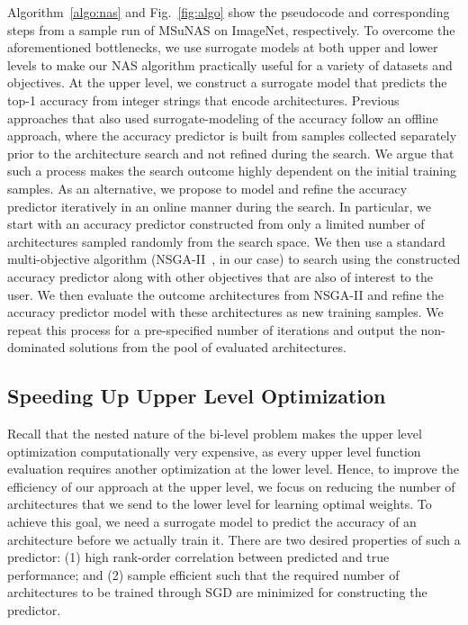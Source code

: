 \documentclass[runningheads]{llncs}
\def\ourmethod{MSuNAS}
\begin{document}
Algorithm~\ref{algo:nas} and Fig.~\ref{fig:algo} show the pseudocode and corresponding steps from a sample run of \ourmethod{} on ImageNet, respectively. To overcome the aforementioned bottlenecks, we use surrogate models at both upper and lower levels to make our NAS algorithm practically useful for a variety of datasets and objectives. At the upper level, we construct a surrogate model that predicts the top-1 accuracy from integer strings that encode architectures. Previous approaches \cite{chamnet,ae-cnn+e2epp,onceforall} that also used surrogate-modeling of the accuracy follow an offline approach, where the accuracy predictor is built from samples collected separately prior to the architecture search and not refined during the search. We argue that such a process makes the search outcome highly dependent on the initial training samples. As an alternative, we propose to model and refine the accuracy predictor iteratively in an online manner during the search. In particular, we start with an accuracy predictor constructed from only a limited number of architectures sampled randomly from the search space. We then use a standard multi-objective algorithm (NSGA-II~\cite{nsga2}, in our case) to search using the constructed accuracy predictor along with other objectives that are also of interest to the user. We then evaluate the outcome architectures from NSGA-II and refine the accuracy predictor model with these architectures as new training samples. We repeat this process for a pre-specified number of iterations and output the non-dominated solutions from the pool of evaluated architectures.

\subsection{Speeding Up Upper Level Optimization}
Recall that the nested nature of the bi-level problem makes the upper level optimization computationally very expensive, as every upper level function evaluation requires another optimization at the lower level. Hence, to improve the efficiency of our approach at the upper level, we focus on reducing the number of architectures that we send to the lower level for learning optimal weights. To achieve this goal, we need a surrogate model to predict the accuracy of an architecture before we actually train it. There are two desired properties of such a predictor: (1) high rank-order correlation between predicted and true performance; and (2) sample efficient such that the required number of architectures to be trained through SGD are minimized for constructing the predictor.
\end{document}
